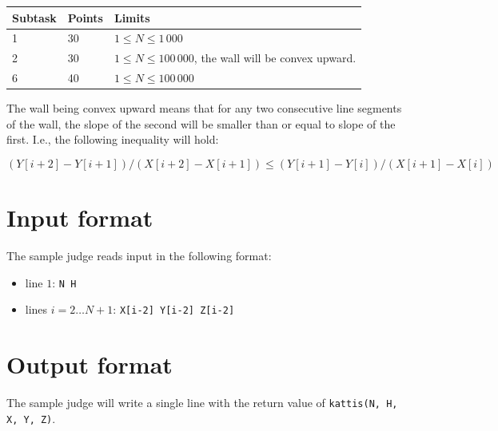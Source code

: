 \begin{tabular}{|l|l|l|}
  \hline
  \textbf{Subtask} & \textbf{Points} & \textbf{Limits} \\ \hline
  1 & 30 & $1 \le N \le 1\,000$ \\ \hline
  2 & 30 & $1 \le N \le 100\,000$, the wall will be convex upward. \\ \hline
  6 & 40 & $1 \le N \le 100\,000$ \\ \hline
\end{tabular}

The wall being convex upward means that for any two consecutive line segments of the wall, the slope of the second will be smaller than or equal to slope of the first.
I.e., the following inequality will hold:

$$(Y[i+2] - Y[i+1]) / (X[i+2] - X[i+1]) \le (Y[i+1] - Y[i]) / (X[i+1] - X[i])$$

\section*{Input format}
The sample judge reads input in the following format:

\begin{itemize}
  \item line $1$: \texttt{N H}
  \item lines $i = 2 \dots N+1$: \texttt{X[i-2] Y[i-2] Z[i-2]}
\end{itemize}

\section*{Output format}
The sample judge will write a single line with the return value of \texttt{kattis(N, H, X, Y, Z)}.
